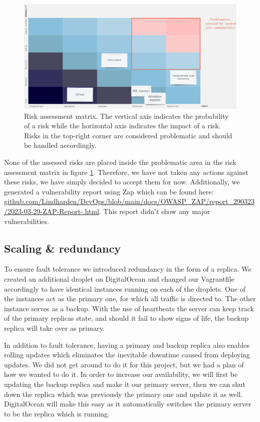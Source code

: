 \begin{figure}[H]
    \centering
    \includegraphics[width=\textwidth]{images/risk_matrix.png}
    \caption{Risk assessment matrix. The vertical axis indicates the probability of a risk while the horizontal axis indicates the impact of a risk. Risks in the top-right corner are considered problematic and should be handled accordingly.}
    \label{fig:risk_matrix}
\end{figure}

None of the assessed risks are placed inside the problematic area in the risk assessment matrix in figure \ref{fig:risk_matrix}. Therefore, we have not taken any actions against these risks, we have simply decided to accept them for now. Additionally, we generated a vulnerability report using Zap which can be found here: \href{https://htmlpreview.github.io/?https://github.com/Lindharden/DevOps/blob/main/docs/OWASP_ZAP/report_290323/2023-03-29-ZAP-Report-.html}{github.com/Lindharden/DevOps/blob/main/docs/OWASP\_ZAP/report\_290323/2023-03-29-ZAP-Report-.html}. This report didn't show any major vulnerabilities.

\subsection{Scaling \& redundancy} \label{sec:scaling}
To ensure fault tolerance we introduced redundancy in the form of a replica. We created an additional droplet on DigitalOcean and changed our Vagrantfile accordingly to have identical instances running on each of the droplets. One of the instances act as the primary one, for which all traffic is directed to. The other instance serves as a backup. With the use of heartbeats the server can keep track of the primary replicas state, and should it fail to show signs of life, the backup replica will take over as primary.

In addition to fault tolerance, having a primary and backup replica also enables rolling updates which eliminates the inevitable downtime caused from deploying updates. We did not get around to do it for this project, but we had a plan of how we wanted to do it. In order to increase our availability, we will first be updating the backup replica and make it our primary server, then we can shut down the replica which was previously the primary one and update it as well. DigitalOcean will make this easy as it automatically switches the primary server to be the replica which is running.